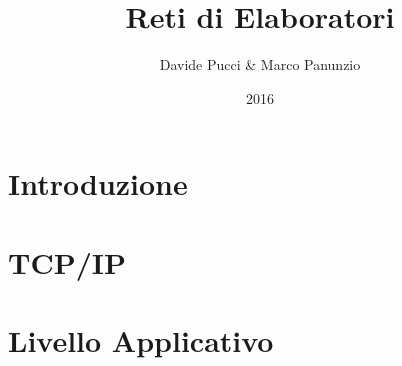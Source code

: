

\title{Reti di Elaboratori}
\author{Davide Pucci \& Marco Panunzio}
\date{2016}



\maketitle

\tableofcontents

\chapter{Introduzione}


\chapter{TCP/IP}


\chapter{Livello Applicativo}



